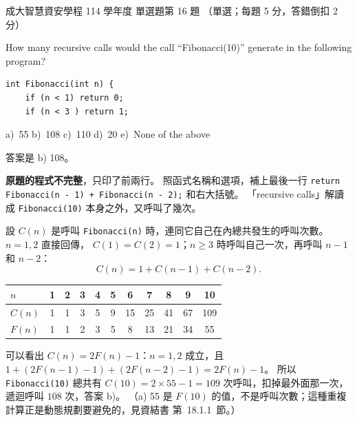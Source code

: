\begin{pastexam}[label={px:ncku-114-isec-ds-16}]{成大智慧資安學程 114 學年度 單選題第 16 題}
（單選；每題 5 分，答錯倒扣 2 分）

How many recursive calls would the call ``Fibonacci(10)'' generate in the following program?
\begin{verbatim}
int Fibonacci(int n) {
    if (n < 1) return 0;
    if (n < 3 ) return 1;
\end{verbatim}
a)~55 \qquad b)~108 \qquad c)~110 \qquad d)~20 \qquad e)~None of the above
\end{pastexam}

\begin{pastsoln}
答案是 b) 108。

\textbf{原題的程式不完整}，只印了前兩行。 照函式名稱和選項，補上最後一行
\texttt{return Fibonacci(n - 1) + Fibonacci(n - 2);} 和右大括號。 「recursive calls」解讀成
\texttt{Fibonacci(10)} 本身之外，又呼叫了幾次。

設 $C(n)$ 是呼叫 \texttt{Fibonacci(n)} 時，連同它自己在內總共發生的呼叫次數。 $n = 1, 2$ 直接回傳，
$C(1) = C(2) = 1$；$n \ge 3$ 時呼叫自己一次，再呼叫 $n - 1$ 和 $n - 2$：
\[
C(n) = 1 + C(n - 1) + C(n - 2) .
\]
\begin{center}
\small
\begin{tabular}{l*{10}{c}}
\toprule
$n$ & 1 & 2 & 3 & 4 & 5 & 6 & 7 & 8 & 9 & 10 \\
\midrule
$C(n)$ & 1 & 1 & 3 & 5 & 9 & 15 & 25 & 41 & 67 & 109 \\
$F(n)$ & 1 & 1 & 2 & 3 & 5 & 8 & 13 & 21 & 34 & 55 \\
\bottomrule
\end{tabular}
\end{center}
可以看出 $C(n) = 2F(n) - 1$：$n = 1, 2$ 成立，且 $1 + (2F(n-1) - 1) + (2F(n-2) - 1) = 2F(n) - 1$。
所以 \texttt{Fibonacci(10)} 總共有 $C(10) = 2 \times 55 - 1 = 109$ 次呼叫，扣掉最外面那一次，遞迴呼叫
$108$ 次，答案 b)。 （a) 55 是 $F(10)$ 的值，不是呼叫次數；這種重複計算正是動態規劃要避免的，見資結書
第~18.1.1~節。）
\end{pastsoln}
